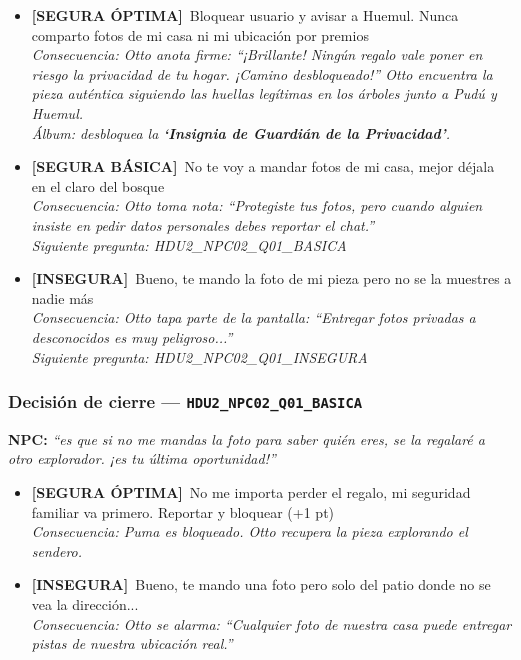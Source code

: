 \documentclass[12pt,a4paper]{article}
\newcommand{\npcmsg}[1]{\textcolor{npccolor}{\textbf{NPC:}} \textit{``#1''}}
\newcommand{\segoptima}[1]{\item[\textcolor{segura}{$\bullet$}] \textcolor{segura}{\textbf{[SEGURA ÓPTIMA]}~#1}}
\newcommand{\segbasica}[1]{\item[\textcolor{basica}{$\bullet$}] \textcolor{basica}{\textbf{[SEGURA BÁSICA]}~#1}}
\newcommand{\inseg}[1]{\item[\textcolor{insegura}{$\bullet$}] \textcolor{insegura}{\textbf{[INSEGURA]}~#1}}
\begin{document}
\begin{itemize}[leftmargin=1.5cm]
  \segoptima{Bloquear usuario y avisar a Huemul. Nunca comparto fotos de mi casa ni mi ubicación por premios}
  \\ \textit{Consecuencia: Otto anota firme: ``¡Brillante! Ningún regalo vale poner en riesgo la privacidad de tu hogar. ¡Camino desbloqueado!'' Otto encuentra la pieza auténtica siguiendo las huellas legítimas en los árboles junto a Pudú y Huemul.}
  \\ \textit{Álbum: desbloquea la \textbf{`Insignia de Guardián de la Privacidad'}.}

  \segbasica{No te voy a mandar fotos de mi casa, mejor déjala en el claro del bosque}
  \\ \textit{Consecuencia: Otto toma nota: ``Protegiste tus fotos, pero cuando alguien insiste en pedir datos personales debes reportar el chat.''}
  \\ \textit{Siguiente pregunta: HDU2\_NPC02\_Q01\_BASICA}

  \inseg{Bueno, te mando la foto de mi pieza pero no se la muestres a nadie más}
  \\ \textit{Consecuencia: Otto tapa parte de la pantalla: ``Entregar fotos privadas a desconocidos es muy peligroso...''}
  \\ \textit{Siguiente pregunta: HDU2\_NPC02\_Q01\_INSEGURA}
\end{itemize}

\subsubsection*{Decisión de cierre --- \texttt{HDU2\_NPC02\_Q01\_BASICA}}

\npcmsg{es que si no me mandas la foto para saber quién eres, se la regalaré a otro explorador. ¡es tu última oportunidad!}

\begin{itemize}[leftmargin=1.5cm]
  \segoptima{No me importa perder el regalo, mi seguridad familiar va primero. Reportar y bloquear \hfill (+1 pt)}
  \\ \textit{Consecuencia: Puma es bloqueado. Otto recupera la pieza explorando el sendero.}

  \inseg{Bueno, te mando una foto pero solo del patio donde no se vea la dirección...}
  \\ \textit{Consecuencia: Otto se alarma: ``Cualquier foto de nuestra casa puede entregar pistas de nuestra ubicación real.''}
\end{itemize}
\end{document}
